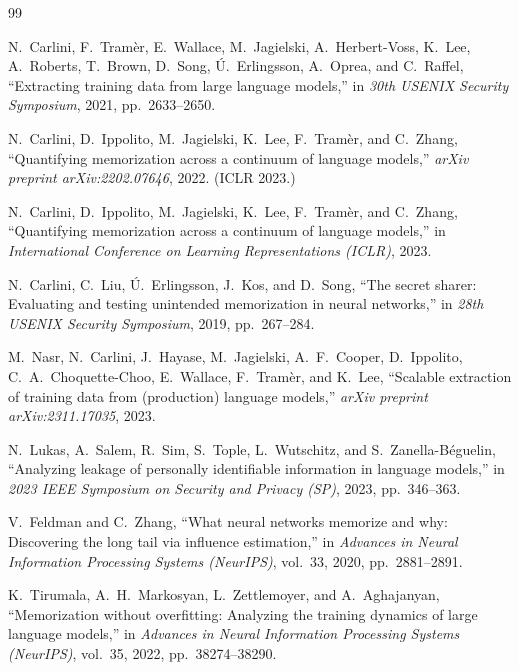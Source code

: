 \documentclass[letterpaper,twocolumn,10pt]{article}
\begin{document}
\begin{thebibliography}{99}

N.~Carlini, F.~Tram\`{e}r, E.~Wallace, M.~Jagielski, A.~Herbert-Voss, K.~Lee,
A.~Roberts, T.~Brown, D.~Song, \'{U}.~Erlingsson, A.~Oprea, and C.~Raffel,
``Extracting training data from large language models,'' in \emph{30th USENIX
Security Symposium}, 2021, pp.~2633--2650.

N.~Carlini, D.~Ippolito, M.~Jagielski, K.~Lee, F.~Tram\`{e}r, and C.~Zhang,
``Quantifying memorization across a continuum of language models,''
\emph{arXiv preprint arXiv:2202.07646}, 2022. (ICLR 2023.)

N.~Carlini, D.~Ippolito, M.~Jagielski, K.~Lee, F.~Tram\`{e}r, and C.~Zhang,
``Quantifying memorization across a continuum of language models,'' in
\emph{International Conference on Learning Representations (ICLR)}, 2023.

N.~Carlini, C.~Liu, \'{U}.~Erlingsson, J.~Kos, and D.~Song, ``The secret
sharer: Evaluating and testing unintended memorization in neural networks,''
in \emph{28th USENIX Security Symposium}, 2019, pp.~267--284.

M.~Nasr, N.~Carlini, J.~Hayase, M.~Jagielski, A.~F.~Cooper, D.~Ippolito,
C.~A.~Choquette-Choo, E.~Wallace, F.~Tram\`{e}r, and K.~Lee, ``Scalable
extraction of training data from (production) language models,'' \emph{arXiv
preprint arXiv:2311.17035}, 2023.

N.~Lukas, A.~Salem, R.~Sim, S.~Tople, L.~Wutschitz, and
S.~Zanella-B\'{e}guelin, ``Analyzing leakage of personally identifiable
information in language models,'' in \emph{2023 IEEE Symposium on Security and
Privacy (SP)}, 2023, pp.~346--363.

V.~Feldman and C.~Zhang, ``What neural networks memorize and why: Discovering
the long tail via influence estimation,'' in \emph{Advances in Neural
Information Processing Systems (NeurIPS)}, vol.~33, 2020, pp.~2881--2891.

K.~Tirumala, A.~H.~Markosyan, L.~Zettlemoyer, and A.~Aghajanyan,
``Memorization without overfitting: Analyzing the training dynamics of large
language models,'' in \emph{Advances in Neural Information Processing Systems
(NeurIPS)}, vol.~35, 2022, pp.~38274--38290.


\end{thebibliography}
\end{document}
